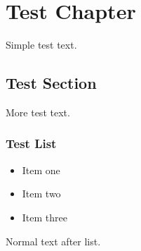 \documentclass[../main.tex]{subfiles}
\begin{document}
\chapter{Test Chapter}

Simple test text.

\section{Test Section}

More test text.

\subsection{Test List}

\begin{itemize}
    \item Item one
    \item Item two  
    \item Item three
\end{itemize}

Normal text after list.
\end{document}
